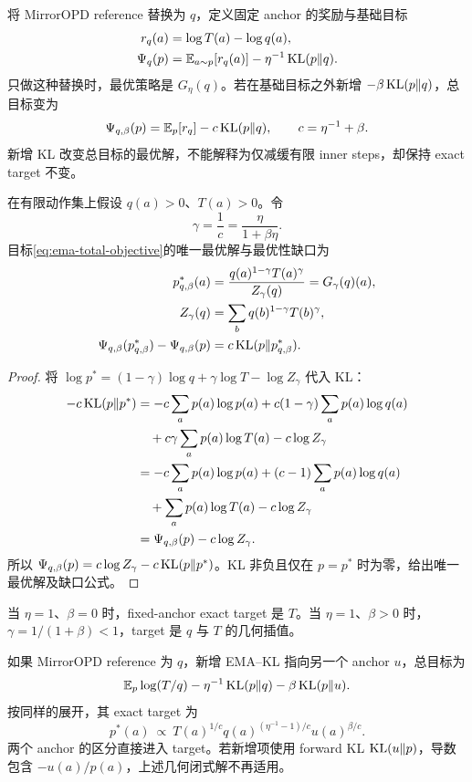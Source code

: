 将 MirrorOPD reference 替换为 $q$，定义固定 anchor 的奖励与基础目标
\begin{align}
 r_q(a)&=\log T(a)-\log q(a),\\
 \Psi_q(p)&=\mathbb{E}_{a\sim p}[r_q(a)]-\eta^{-1}\operatorname{KL}(p\Vert q).
 \label{eq:ema-base-objective}
\end{align}
只做这种替换时，最优策略是 $G_\eta(q)$。若在基础目标之外新增 $-\beta\operatorname{KL}(p\Vert q)$，总目标变为
\begin{equation}
 \Psi_{q,\beta}(p)=\mathbb{E}_p[r_q]-c\operatorname{KL}(p\Vert q),
 \qquad c=\eta^{-1}+\beta.
 \label{eq:ema-total-objective}
\end{equation}
新增 KL 改变总目标的最优解，不能解释为仅减缓有限 inner steps，却保持 exact target 不变。

\begin{theorem}
\label{thm:ema-effective-eta}
在有限动作集上假设 $q(a)>0$、$T(a)>0$。令
\[
 \gamma=\frac1c=\frac{\eta}{1+\beta\eta}.
\]
目标\eqref{eq:ema-total-objective}的唯一最优解与最优性缺口为
\begin{align}
 p^*_{q,\beta}(a)&=\frac{q(a)^{1-\gamma}T(a)^\gamma}{Z_\gamma(q)}
 =G_\gamma(q)(a),\\
 Z_\gamma(q)&=\sum_bq(b)^{1-\gamma}T(b)^\gamma,\\
 \Psi_{q,\beta}(p^*_{q,\beta})-\Psi_{q,\beta}(p)
 &=c\operatorname{KL}(p\Vert p^*_{q,\beta}).
\end{align}
\end{theorem}
\begin{proof}
将 $\log p^*=(1-\gamma)\log q+\gamma\log T-\log Z_\gamma$ 代入 KL：
\begin{align*}
 -c\operatorname{KL}(p\Vert p^*)
 &=-c\sum_ap(a)\log p(a)
   +c(1-\gamma)\sum_ap(a)\log q(a)\\
 &\quad+c\gamma\sum_ap(a)\log T(a)-c\log Z_\gamma\\
 &=-c\sum_ap(a)\log p(a)
   +(c-1)\sum_ap(a)\log q(a)\\
 &\quad+\sum_ap(a)\log T(a)-c\log Z_\gamma\\
 &=\Psi_{q,\beta}(p)-c\log Z_\gamma.
\end{align*}
所以 $\Psi_{q,\beta}(p)=c\log Z_\gamma-c\operatorname{KL}(p\Vert p^*)$。KL 非负且仅在 $p=p^*$ 时为零，给出唯一最优解及缺口公式。
\end{proof}

当 $\eta=1$、$\beta=0$ 时，fixed-anchor exact target 是 $T$。当 $\eta=1$、$\beta>0$ 时，$\gamma=1/(1+\beta)<1$，target 是 $q$ 与 $T$ 的几何插值。

如果 MirrorOPD reference 为 $q$，新增 EMA--KL 指向另一个 anchor $u$，总目标为
\[
 \mathbb{E}_p\log(T/q)-\eta^{-1}\operatorname{KL}(p\Vert q)-\beta\operatorname{KL}(p\Vert u).
\]
按同样的展开，其 exact target 为
\[
 p^*(a)\ \propto\ T(a)^{1/c}
 q(a)^{(\eta^{-1}-1)/c}u(a)^{\beta/c}.
\]
两个 anchor 的区分直接进入 target。若新增项使用 forward KL $\operatorname{KL}(u\Vert p)$，导数包含 $-u(a)/p(a)$，上述几何闭式解不再适用。


